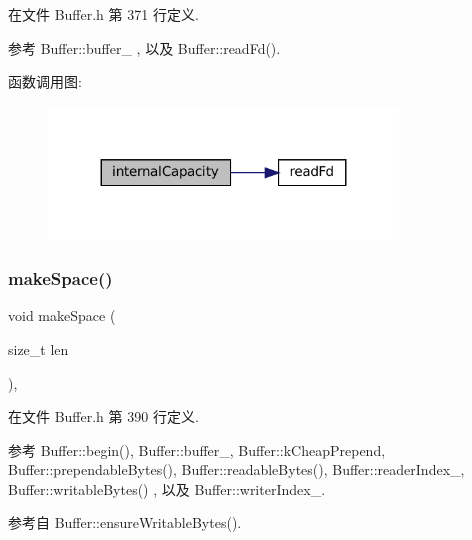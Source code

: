 在文件 Buffer.\+h 第 371 行定义.



参考 Buffer\+::buffer\+\_\+ , 以及 Buffer\+::read\+Fd().

函数调用图\+:
\nopagebreak
\begin{figure}[H]
\begin{center}
\leavevmode
\includegraphics[width=263pt]{classmuduo_1_1net_1_1Buffer_add5064782687c36289ea4905a58caef2_cgraph}
\end{center}
\end{figure}
\mbox{\label{classmuduo_1_1net_1_1Buffer_a83d5a5ce302569b35df7743314578791}} 
\subsubsection{\texorpdfstring{make\+Space()}{makeSpace()}}
{\footnotesize\ttfamily void make\+Space (\begin{DoxyParamCaption}\item[{size\+\_\+t}]{len }\end{DoxyParamCaption})\hspace{0.3cm}{\ttfamily [inline]}, {\ttfamily [private]}}



在文件 Buffer.\+h 第 390 行定义.



参考 Buffer\+::begin(), Buffer\+::buffer\+\_\+, Buffer\+::k\+Cheap\+Prepend, Buffer\+::prependable\+Bytes(), Buffer\+::readable\+Bytes(), Buffer\+::reader\+Index\+\_\+, Buffer\+::writable\+Bytes() , 以及 Buffer\+::writer\+Index\+\_\+.



参考自 Buffer\+::ensure\+Writable\+Bytes().

